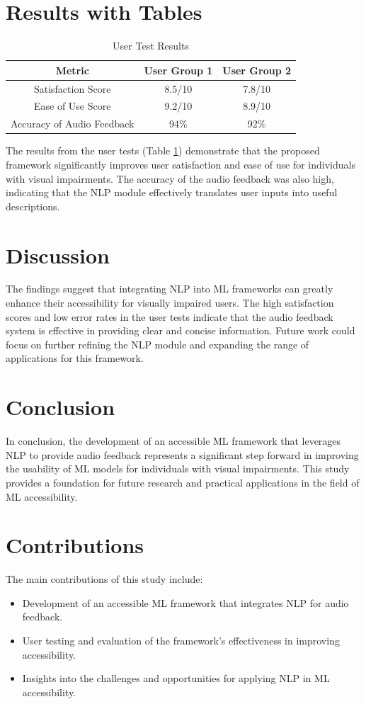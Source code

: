\documentclass{article}
\begin{document}
\section{Results with Tables}
\begin{table}[ht]
\centering
\begin{tabular}{|c|c|c|}
\hline
\textbf{Metric} & \textbf{User Group 1} & \textbf{User Group 2} \\ \hline
Satisfaction Score & 8.5/10 & 7.8/10 \\ \hline
Ease of Use Score & 9.2/10 & 8.9/10 \\ \hline
Accuracy of Audio Feedback & 94\% & 92\% \\ \hline
\end{tabular}
\caption{User Test Results}
\label{tab:user_test_results}
\end{table}

The results from the user tests (Table \ref{tab:user_test_results}) demonstrate that the proposed framework significantly improves user satisfaction and ease of use for individuals with visual impairments. The accuracy of the audio feedback was also high, indicating that the NLP module effectively translates user inputs into useful descriptions.

\section{Discussion}
The findings suggest that integrating NLP into ML frameworks can greatly enhance their accessibility for visually impaired users. The high satisfaction scores and low error rates in the user tests indicate that the audio feedback system is effective in providing clear and concise information. Future work could focus on further refining the NLP module and expanding the range of applications for this framework.

\section{Conclusion}
In conclusion, the development of an accessible ML framework that leverages NLP to provide audio feedback represents a significant step forward in improving the usability of ML models for individuals with visual impairments. This study provides a foundation for future research and practical applications in the field of ML accessibility.

\section{Contributions}
The main contributions of this study include:
\begin{itemize}
    \item Development of an accessible ML framework that integrates NLP for audio feedback.
    \item User testing and evaluation of the framework's effectiveness in improving accessibility.
    \item Insights into the challenges and opportunities for applying NLP in ML accessibility.
\end{itemize}
\end{document}
